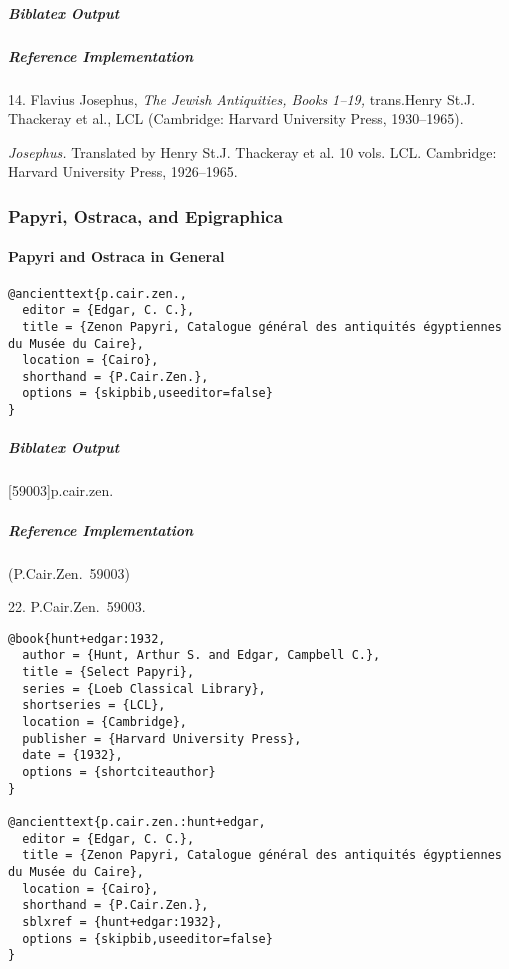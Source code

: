 \documentclass[a4paper]{article}
\newenvironment{biboutput}{%
  \subparagraph{Biblatex Output}
}{\color{black}}
\newenvironment{refimp}{%
  \subparagraph{Reference Implementation}
  \color{reference-colour}
  \rm
}{\par\color{black}}
\begin{document}
\begin{biboutput}
\end{biboutput}

\begin{refimp}
  \hspace*{\bibindent}14. Flavius Josephus, \emph{The Jewish Antiquities,
  Books 1–19,} trans.\@ Henry St.\@ J. Thackeray et al., LCL (Cambridge:
  Harvard University Press, 1930–1965).

  \hangindent\bibindent \emph{Josephus.} Translated by Henry St.\@ J. Thackeray
  et al. 10 vols. LCL. Cambridge: Harvard University Press, 1926–1965.

\end{refimp}

\subsubsection{Papyri, Ostraca, and Epigraphica}

\paragraph{Papyri and Ostraca in General}

\begin{lstlisting}
@ancienttext{p.cair.zen.,
  editor = {Edgar, C. C.},
  title = {Zenon Papyri, Catalogue général des antiquités égyptiennes du Musée du Caire},
  location = {Cairo},
  shorthand = {P.Cair.Zen.},
  options = {skipbib,useeditor=false}
}
\end{lstlisting}

\begin{biboutput}
  [59003]{p.cair.zen.}
\end{biboutput}

\begin{refimp}
  (P.Cair.Zen.\ 59003)

  \hspace*{\bibindent}22. P.Cair.Zen.\ 59003.
\end{refimp}

\medskip

\begin{lstlisting}
@book{hunt+edgar:1932,
  author = {Hunt, Arthur S. and Edgar, Campbell C.},
  title = {Select Papyri},
  series = {Loeb Classical Library},
  shortseries = {LCL},
  location = {Cambridge},
  publisher = {Harvard University Press},
  date = {1932},
  options = {shortciteauthor}
}

@ancienttext{p.cair.zen.:hunt+edgar,
  editor = {Edgar, C. C.},
  title = {Zenon Papyri, Catalogue général des antiquités égyptiennes du Musée du Caire},
  location = {Cairo},
  shorthand = {P.Cair.Zen.},
  sblxref = {hunt+edgar:1932},
  options = {skipbib,useeditor=false}
}
\end{lstlisting}
\end{document}
